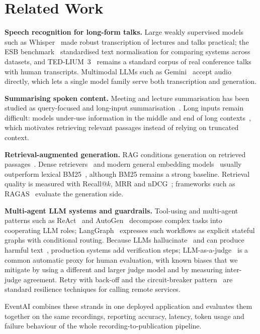 \section{Related Work}
\textbf{Speech recognition for long-form talks.} Large weakly supervised models such as
Whisper~\cite{radford2023whisper} made robust transcription of lectures and talks practical;
the ESB benchmark~\cite{gandhi2022esb} standardised text normalisation for comparing systems
across datasets, and TED-LIUM~3~\cite{hernandez2018tedlium} remains a standard corpus of
real conference talks with human transcripts. Multimodal LLMs such as
Gemini~\cite{gemini2023} accept audio directly, which lets a single model family serve both
transcription and generation.

\textbf{Summarising spoken content.} Meeting and lecture summarisation has been studied as
query-focused and long-input summarisation~\cite{zhong2021qmsum}. Long inputs remain
difficult: models under-use information in the middle and end of long
contexts~\cite{liu2024lost}, which motivates retrieving relevant passages instead of relying
on truncated context.

\textbf{Retrieval-augmented generation.} RAG conditions generation on retrieved
passages~\cite{lewis2020rag}. Dense retrievers~\cite{karpukhin2020dpr} and modern general
embedding models~\cite{lee2025geminiembedding} usually outperform lexical
BM25~\cite{robertson2009bm25}, although BM25 remains a strong baseline. Retrieval quality is
measured with Recall@$k$, MRR and nDCG~\cite{jarvelin2002ndcg}; frameworks such as
RAGAS~\cite{es2024ragas} evaluate the generation side.

\textbf{Multi-agent LLM systems and guardrails.} Tool-using and multi-agent patterns such as
ReAct~\cite{yao2023react} and AutoGen~\cite{wu2023autogen} decompose complex tasks into
cooperating LLM roles; LangGraph~\cite{langgraph} expresses such workflows as explicit
stateful graphs with conditional routing. Because LLMs hallucinate~\cite{ji2023hallucination}
and can produce harmful text~\cite{gehman2020realtoxicity}, production systems add
verification steps; LLM-as-a-judge~\cite{zheng2023judging,liu2023geval} is a common
automatic proxy for human evaluation, with known biases that we mitigate by using a different
and larger judge model and by measuring inter-judge agreement. Retry with back-off and the
circuit-breaker pattern~\cite{nygard2018releaseit} are standard resilience techniques for
calling remote services.

EventAI combines these strands in one deployed application and evaluates them together on
the same recordings, reporting accuracy, latency, token usage and failure behaviour of the
whole recording-to-publication pipeline.
